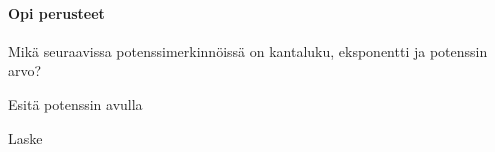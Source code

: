 \begin{tehtavasivu}

\paragraph*{Opi perusteet}

\begin{tehtava}
Mikä seuraavissa potenssimerkinnöissä on kantaluku, eksponentti ja potenssin arvo?
    \begin{alakohdat}
    \end{alakohdat}
\begin{vastaus}
 \begin{alakohdat}
 \end{alakohdat}
\end{vastaus}
\end{tehtava}


 \begin{tehtava}
        Esitä potenssin avulla 
        \begin{alakohdat}
        \end{alakohdat}
        
        \begin{vastaus}
        \begin{alakohdatrivi}
        \end{alakohdatrivi}
        \end{vastaus}
    \end{tehtava}
    \begin{tehtava}
    Laske
        \begin{alakohdatrivi}
 		\end{alakohdatrivi}
        \begin{vastaus}
        \begin{alakohdatrivi}
        \end{alakohdatrivi}
        \end{vastaus}
    \end{tehtava}



\end{tehtavasivu}
